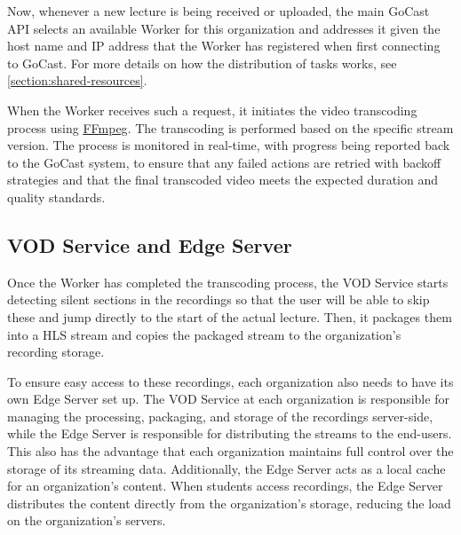 Now, whenever a new lecture is being received or uploaded, the main GoCast \ac{API} selects an available Worker for this organization and addresses it given the host name and IP address that the Worker has registered when first connecting to GoCast. For more details on how the distribution of tasks works, see \autoref{section:shared-resources}.

When the Worker receives such a request, it initiates the video transcoding process using \href{https://ffmpeg.org/}{FFmpeg}. The transcoding is performed based on the specific stream version\footnotemark[6]. 
The process is monitored in real-time, with progress being reported back to the GoCast system, to ensure that any failed actions are retried with backoff strategies and that the final transcoded video meets the expected duration and quality standards.


\subsection{VOD Service and Edge Server}

Once the Worker has completed the transcoding process, the VOD Service starts detecting silent sections in the recordings so that the user will be able to skip these and jump directly to the start of the actual lecture. Then, it packages them into a \ac{HLS} stream and copies the packaged stream to the organization's recording storage.

To ensure easy access to these recordings, each organization also needs to have its own Edge Server set up. The VOD Service at each organization is responsible for managing the processing, packaging, and storage of the recordings server-side, while the Edge Server is responsible for distributing the streams to the end-users. This also has the advantage that each organization maintains full control over the storage of its streaming data.
Additionally, the Edge Server acts as a local cache for an organization's content. When students access recordings, the Edge Server distributes the content directly from the organization's storage, reducing the load on the organization's servers.

